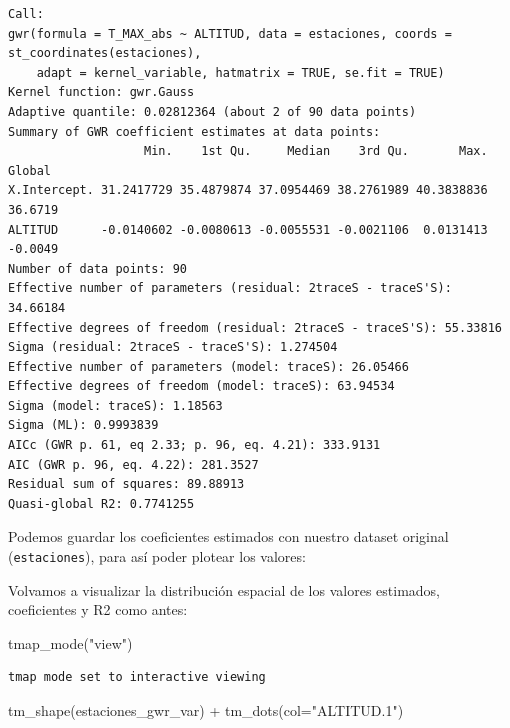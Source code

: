 \documentclass[
  letterpaper,
  DIV=11,
  numbers=noendperiod]{scrreprt}
\newenvironment{Shaded}{\begin{snugshade}}{\end{snugshade}}
\newcommand{\AttributeTok}[1]{\textcolor[rgb]{0.40,0.45,0.13}{#1}}
\newcommand{\FunctionTok}[1]{\textcolor[rgb]{0.28,0.35,0.67}{#1}}
\newcommand{\NormalTok}[1]{\textcolor[rgb]{0.00,0.23,0.31}{#1}}
\newcommand{\OtherTok}[1]{\textcolor[rgb]{0.00,0.23,0.31}{#1}}
\newcommand{\SpecialCharTok}[1]{\textcolor[rgb]{0.37,0.37,0.37}{#1}}
\newcommand{\StringTok}[1]{\textcolor[rgb]{0.13,0.47,0.30}{#1}}
\begin{document}
\begin{verbatim}
Call:
gwr(formula = T_MAX_abs ~ ALTITUD, data = estaciones, coords = st_coordinates(estaciones), 
    adapt = kernel_variable, hatmatrix = TRUE, se.fit = TRUE)
Kernel function: gwr.Gauss 
Adaptive quantile: 0.02812364 (about 2 of 90 data points)
Summary of GWR coefficient estimates at data points:
                   Min.    1st Qu.     Median    3rd Qu.       Max.  Global
X.Intercept. 31.2417729 35.4879874 37.0954469 38.2761989 40.3838836 36.6719
ALTITUD      -0.0140602 -0.0080613 -0.0055531 -0.0021106  0.0131413 -0.0049
Number of data points: 90 
Effective number of parameters (residual: 2traceS - traceS'S): 34.66184 
Effective degrees of freedom (residual: 2traceS - traceS'S): 55.33816 
Sigma (residual: 2traceS - traceS'S): 1.274504 
Effective number of parameters (model: traceS): 26.05466 
Effective degrees of freedom (model: traceS): 63.94534 
Sigma (model: traceS): 1.18563 
Sigma (ML): 0.9993839 
AICc (GWR p. 61, eq 2.33; p. 96, eq. 4.21): 333.9131 
AIC (GWR p. 96, eq. 4.22): 281.3527 
Residual sum of squares: 89.88913 
Quasi-global R2: 0.7741255 
\end{verbatim}

Podemos guardar los coeficientes estimados con nuestro dataset original
(\texttt{estaciones}), para así poder plotear los valores:

\begin{Shaded}
\end{Shaded}

Volvamos a visualizar la distribución espacial de los valores estimados,
coeficientes y R2 como antes:

\begin{Shaded}
\begin{Highlighting}[]
\FunctionTok{tmap\_mode}\NormalTok{(}\StringTok{"view"}\NormalTok{)}
\end{Highlighting}
\end{Shaded}

\begin{verbatim}
tmap mode set to interactive viewing
\end{verbatim}

\begin{Shaded}
\begin{Highlighting}[]
\FunctionTok{tm\_shape}\NormalTok{(estaciones\_gwr\_var) }\SpecialCharTok{+}
    \FunctionTok{tm\_dots}\NormalTok{(}\AttributeTok{col=}\StringTok{"ALTITUD.1"}\NormalTok{)}
\end{Highlighting}
\end{Shaded}
\end{document}

